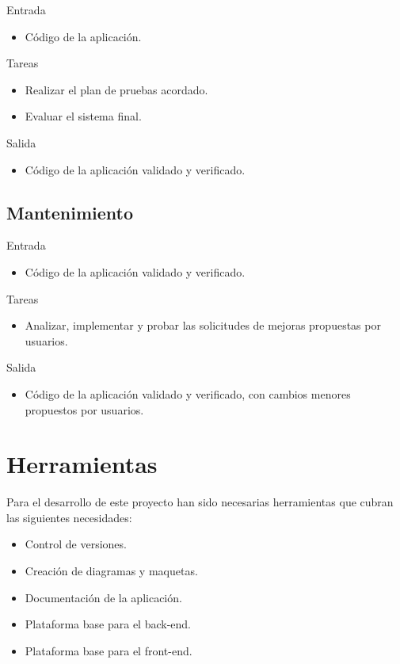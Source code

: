 Entrada
\begin{itemize}[leftmargin=3.5em]
  \item Código de la aplicación.
\end{itemize}

Tareas
\begin{itemize}[leftmargin=3.5em]
  \item Realizar el plan de pruebas acordado.
  \item Evaluar el sistema final.
\end{itemize}

Salida
\begin{itemize}[leftmargin=3.5em]
  \item Código de la aplicación validado y verificado.
\end{itemize}

\subsection*{Mantenimiento\label{ssec:dp:mantenimiento}}

Entrada
\begin{itemize}[leftmargin=3.5em]
  \item Código de la aplicación validado y verificado.
\end{itemize}

Tareas
\begin{itemize}[leftmargin=3.5em]
  \item Analizar, implementar y probar las solicitudes de mejoras propuestas por usuarios. 
\end{itemize}

Salida
\begin{itemize}[leftmargin=3.5em]
  \item Código de la aplicación validado y verificado, con cambios menores propuestos por usuarios.
\end{itemize}


\section{Herramientas\label{sec:dp:herramientas}}

Para el desarrollo de este proyecto han sido necesarias herramientas que cubran las siguientes necesidades:

\begin{itemize}
  \item Control de versiones.
  \item Creación de diagramas y maquetas.
  \item Documentación de la aplicación.
  \item Plataforma base para el \gls{back-end}.
  \item Plataforma base para el \gls{front-end}.
\end{itemize}

